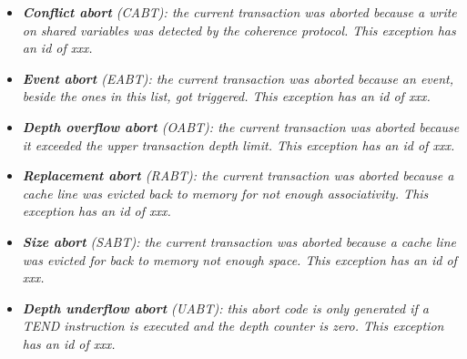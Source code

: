         \begin{itemize}

            \item \textit{\textbf{Conflict abort} (CABT): the current transaction was aborted because a write on shared variables was detected by the coherence protocol. This exception has an id of xxx.}

            \item \textit{\textbf{Event abort} (EABT): the current transaction was aborted because an event, beside the ones in this list, got triggered. This exception has an id of xxx.}

            \item \textit{\textbf{Depth overflow abort} (OABT): the current transaction was aborted because it exceeded the upper transaction depth limit. This exception has an id of xxx.}

            \item \textit{\textbf{Replacement abort} (RABT): the current transaction was aborted because a cache line was evicted back to memory for not enough associativity. This exception has an id of xxx.}

            \item \textit{\textbf{Size abort} (SABT): the current transaction was aborted because a cache line was evicted for back to memory not enough space. This exception has an id of xxx.}

            \item \textit{\textbf{Depth underflow abort} (UABT): this abort code is only generated if a TEND instruction is executed and the depth counter is zero. This exception has an id of xxx.}

        \end{itemize}

